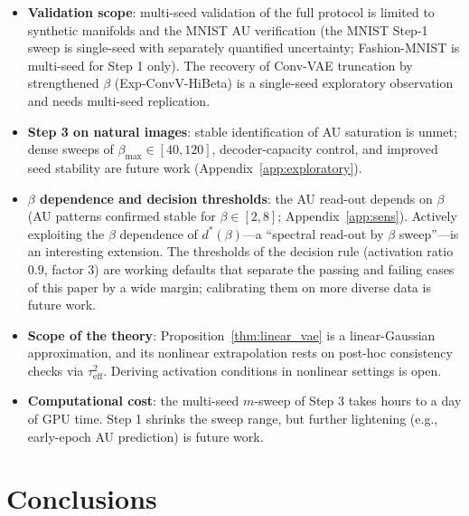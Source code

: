 \documentclass[make,article,submit,pdftex,moreauthors]{Definitions/mdpi}
\newcommand{\dstar}{d^{*}(\beta)}
\begin{document}
\begin{itemize}
  \item \textbf{Validation scope}: multi-seed validation of the full
        protocol is limited to synthetic manifolds and the MNIST AU
        verification (the MNIST Step-1 sweep is single-seed with separately
        quantified uncertainty; Fashion-MNIST is multi-seed for Step 1
        only).
        The recovery of Conv-VAE truncation by strengthened $\beta$
        (Exp-ConvV-HiBeta) is a single-seed exploratory observation and
        needs multi-seed replication.
  \item \textbf{Step 3 on natural images}: stable identification of AU
        saturation is unmet; dense sweeps of
        $\beta_{\max} \in [40, 120]$, decoder-capacity control, and improved
        seed stability are future work (Appendix~\ref{app:exploratory}).
  \item \textbf{$\beta$ dependence and decision thresholds}: the AU
        read-out depends on $\beta$
        (AU patterns confirmed stable for $\beta \in [2, 8]$;
        Appendix~\ref{app:sens}).
        Actively exploiting the $\beta$ dependence of $\dstar$---a
        ``spectral read-out by $\beta$ sweep''---is an interesting
        extension.
        The thresholds of the decision rule (activation ratio $0.9$, factor
        $3$) are working defaults that separate the passing and failing
        cases of this paper by a wide margin; calibrating them on more
        diverse data is future work.
  \item \textbf{Scope of the theory}: Proposition~\ref{thm:linear_vae} is a
        linear-Gaussian approximation, and its nonlinear extrapolation rests
        on post-hoc consistency checks via $\tau^2_{\mathrm{eff}}$.
        Deriving activation conditions in nonlinear settings is open.
  \item \textbf{Computational cost}: the multi-seed $m$-sweep of Step 3
        takes hours to a day of GPU time.
        Step 1 shrinks the sweep range, but further lightening (e.g.,
        early-epoch AU prediction) is future work.
\end{itemize}

\section{Conclusions}\label{sec:conclusion}
\end{document}
